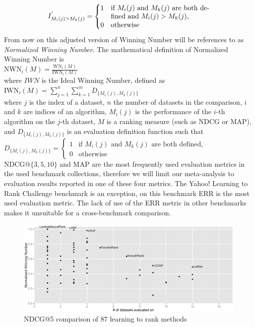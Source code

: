 \documentclass{sig-alternate}
\begin{document}
\[
I^{'}_{M_i(j)>M_k(j)} = \begin{cases}
1 & \parbox[t]{5cm}{if $M_i(j)$ and $M_k(j)$ are both defined and $M_i(j) > M_k(j)$,}\\
0 & \parbox[t]{5cm}{otherwise}
\end{cases}
\]
From now on this adjusted version of Winning Number will be references to as \emph{Normalized Winning Number}. The mathematical definition of Normalized Winning Number is\\

$\text{NWN}_i(M) = \frac{\text{WN}_i(M)}{\text{IWN}_i(M)}$\\

\noindent
where $IWN$ is the Ideal Winning Number, defined as\\

$\text{IWN}_i(M) = \sum\nolimits_{j=1}^n \sum\nolimits_{k=1}^m D_{\{M_i(j),M_k(j)\}}$\\

where $j$ is the index of a dataset, $n$ the number of datasets in the comparison, $i$ and $k$ are indices of an algorithm, $M_i(j)$ is the performance of the $i$-th algorithm on the $j$-th dataset, $M$ is a ranking measure (such as NDCG or MAP), and $D_{\{M_i(j),M_k(j)\}}$ is an evaluation definition function such that\\

$D_{\{M_i(j),M_k(j)\}} = \begin{cases}
1 & \text{if } M_i(j) \text{ and } M_k(j) \text{ are both defined}, \\
0 & \text{otherwise}
\end{cases}$\\

NDCG@$\{3,5,10\}$ and MAP are the most frequently used evaluation metrics in the used benchmark collections, therefore we will limit our meta-analysis to evaluation results reported in one of these four metrics. The Yahoo! Learning to Rank Challenge benchmark is an exception, on this benchmark ERR is the most used evaluation metric. The lack of use of the ERR metric in other benchmarks makes it unsuitable for a cross-benchmark comparison.\\

\begin{figure}
\includegraphics[scale=0.371]{gfx/ndcg5_winnum}
\caption{NDCG@5 comparison of 87 learning to rank methods}
\label{fig:normalized_winning_number_ndcg5}
\end{figure}
\end{document}
